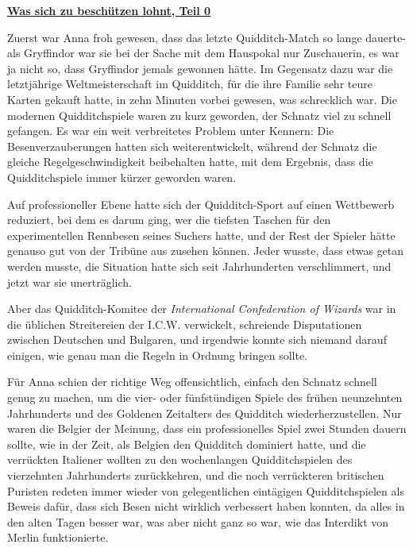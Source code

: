 

\hypertarget{was-sich-zu-beschuxfctzen-lohnt-teil-0}{%

\textbf{\uline{Was sich zu beschützen lohnt, Teil 0}}

Zuerst war Anna froh gewesen, dass das letzte Quidditch-Match so lange dauerte- als Gryffindor war sie bei der Sache mit dem Hauspokal nur Zuschauerin, es war ja nicht so, dass Gryffindor jemals gewonnen hätte. Im Gegensatz dazu war die letztjährige Weltmeisterschaft im Quidditch, für die ihre Familie sehr teure Karten gekauft hatte, in zehn Minuten vorbei gewesen, was schrecklich war. Die modernen Quidditchspiele waren zu kurz geworden, der Schnatz viel zu schnell gefangen. Es war ein weit verbreitetes Problem unter Kennern: Die Besenverzauberungen hatten sich weiterentwickelt, während der Schnatz die gleiche Regelgeschwindigkeit beibehalten hatte, mit dem Ergebnis, dass die Quidditchspiele immer kürzer geworden waren.

Auf professioneller Ebene hatte sich der Quidditch-Sport auf einen Wettbewerb reduziert, bei dem es darum ging, wer die tiefsten Taschen für den experimentellen Rennbesen seines Suchers hatte, und der Rest der Spieler hätte genauso gut von der Tribüne aus zusehen können. Jeder wusste, dass etwas getan werden musste, die Situation hatte sich seit Jahrhunderten verschlimmert, und jetzt war sie unerträglich.

Aber das Quidditch-Komitee der \emph{International Confederation of Wizards} war in die üblichen Streitereien der I.C.W. verwickelt, schreiende Disputationen zwischen Deutschen und Bulgaren, und irgendwie konnte sich niemand darauf einigen, wie genau man die Regeln in Ordnung bringen sollte.

Für Anna schien der richtige Weg offensichtlich, einfach den Schnatz schnell genug zu machen, um die vier- oder fünfstündigen Spiele des frühen neunzehnten Jahrhunderts und des Goldenen Zeitalters des Quidditch wiederherzustellen. Nur waren die Belgier der Meinung, dass ein professionelles Spiel zwei Stunden dauern sollte, wie in der Zeit, als Belgien den Quidditch dominiert hatte, und die verrückten Italiener wollten zu den wochenlangen Quidditchspielen des vierzehnten Jahrhunderts zurückkehren, und die noch verrückteren britischen Puristen redeten immer wieder von gelegentlichen eintägigen Quidditchspielen als Beweis dafür, dass sich Besen nicht wirklich verbessert haben konnten, da alles in den alten Tagen besser war, was aber nicht ganz so war, wie das Interdikt von Merlin funktionierte.

}

